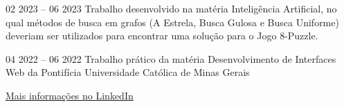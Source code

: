 {
}{02 2023 -- 06 2023}{}
Trabalho desenvolvido na matéria Inteligência Artificial, no qual métodos de busca em grafos (A Estrela, Busca Gulosa e Busca Uniforme) deveriam ser utilizados para encontrar uma solução para o Jogo 8-Puzzle.\\
\divider

{
}{04 2022 -- 06 2022}{}
Trabalho prático da matéria Desenvolvimento de Interfaces Web da Pontifícia Universidade Católica de Minas Gerais\\
\divider

{\large\color{emphasis}\href{https://www.linkedin.com/in/henriquemcc/details/projects/}{Mais informações no LinkedIn}}
